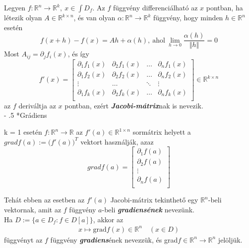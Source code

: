 \documentclass[12pt,margin=0px]{article}
\makeatletter
\newcommand\ddfrac[2]{\frac{\displaystyle #1}{\displaystyle #2}}
\newcommand{\R}{\mathbb{R}}
\renewcommand\paragraph{%
	\@startsection{paragraph}{4}{0mm}%
	{-\baselineskip}%
	{.5\baselineskip}%
	{\normalfont\normalsize\bfseries}}
\makeatother
\begin{document}
     \noindent Legyen $f:\mathbb{R}^n \to \mathbb{R}^k,\ x \in \int D_f$. Az $f$ függvény differenciálható az $x$ pontban, ha létezik olyan $A \in \mathbb{R}^{k \times n}$, és van olyan $\alpha: \mathbb{R}^{n} \to \mathbb{R}^{k}$ függvény, hogy minden $h \in \mathbb{R}^n$ esetén
     \[
        f(x + h) - f(x) = Ah + \alpha(h),\ \text{ahol}\ \lim\limits_{h \to 0} \ddfrac{\alpha(h)}{\Vert h \Vert} = 0
     \]
     Most $A_{ij} = \partial_{j}f_i(x)$, és így
     \[
        f'(x) = \left[
                  \begin{array}{cccc}
                    \partial_1f_1(x) & \partial_2f_1(x) & \ldots & \partial_nf_1(x) \\
                    \partial_1f_2(x) & \partial_2f_2(x) & \ldots & \partial_nf_2(x) \\
                    \vdots & \ldots & \ddots & \vdots \\
                    \partial_1f_k(x) & \partial_2f_k(x) & \ldots & \partial_nf_k(x) \\
                  \end{array}
                \right] \in \mathbb{R}^{k \times n}
     \]
     az $f$ deriváltja az $x$ pontban, ezért \textbf{\emph{Jacobi-mátrix}}nak is nevezik.\\

    \paragraph*{Grádiens}

     \noindent k = 1 esetén $f:\mathbb{R}^n \to \mathbb{R}$ az $f'(a) \in \mathbb{R}^{1 \times n}$ sormátrix helyett a $grad f(a) := \big(f'(a)\big)^{T}$ vektort használják, azaz
     \[
        grad f(a) = \left[
                      \begin{array}{c}
                        \partial_1 f(a) \\
                        \partial_2 f(a) \\
                        \vdots \\
                        \partial_n f(a) \\
                      \end{array}
                    \right]
     \]

	\noindent Tehát ebben az esetben az $f'(a)$ Jacobi-mátrix tekinthető egy $\R^n$-beli vektornak, amit az $f$ függvény $a$-beli \textbf{\emph{gradiensének}} nevezünk. \\

    \noindent Ha $ D := \Big\{a \in D_f : f\in D[a] \Big\} $, akkor az
	\begin{align*}
		x \mapsto \textrm{grad}f(x) \in \R^n \quad (x \in D)
	\end{align*}
	függvényt az $f$ függvény \textbf{\emph{gradiens}}ének nevezzük, és grad$f \in \R^n \rightarrow \R^n$ jelöljük.\\
\end{document}
